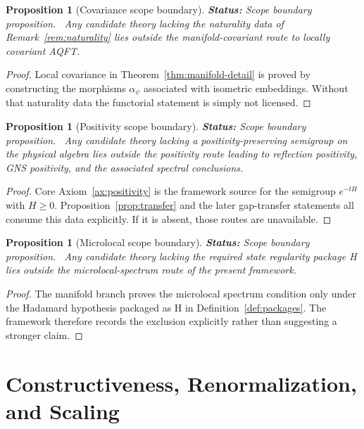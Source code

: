 \documentclass[12pt,a4paper]{article}
\theoremstyle{plain}
\newtheorem{proposition}[theorem]{Proposition}
\theoremstyle{definition}
\theoremstyle{remark}
\newcommand{\status}[1]{\textnormal{\textbf{Status:} #1.}\ }
\begin{document}
\begin{proposition}[Covariance scope boundary]
  \label{prop:scope-covariance}
  \status{Scope boundary proposition}
  Any candidate theory lacking the naturality data of
  Remark~\ref{rem:naturality} lies outside the manifold-covariant
  route to locally covariant AQFT.
\end{proposition}
\begin{proof}
  Local covariance in Theorem~\ref{thm:manifold-detail} is proved by
  constructing the morphisms \(\alpha_\psi\) associated with isometric
  embeddings. Without that naturality data the functorial statement is
  simply not licensed.
\end{proof}

\begin{proposition}[Positivity scope boundary]
  \label{prop:scope-positivity}
  \status{Scope boundary proposition}
  Any candidate theory lacking a positivity-preserving semigroup on
  the physical algebra lies outside the positivity route leading to
  reflection positivity, GNS positivity, and the associated spectral
  conclusions.
\end{proposition}
\begin{proof}
  Core Axiom~\ref{ax:positivity} is the framework source for the
  semigroup \(e^{-tH}\) with \(H\ge0\). Proposition~\ref{prop:transfer}
  and the later gap-transfer statements all consume this data
  explicitly. If it is absent, those routes are unavailable.
\end{proof}

\begin{proposition}[Microlocal scope boundary]
  \label{prop:scope-microlocal}
  \status{Scope boundary proposition}
  Any candidate theory lacking the required state regularity package H
  lies outside the microlocal-spectrum route of the present framework.
\end{proposition}
\begin{proof}
  The manifold branch proves the microlocal spectrum condition only
  under the Hadamard hypothesis packaged as H in
  Definition~\ref{def:packages}. The framework therefore records the
  exclusion explicitly rather than suggesting a stronger claim.
\end{proof}


\section{Constructiveness, Renormalization, and Scaling}
\label{sec:constructive}
\end{document}
